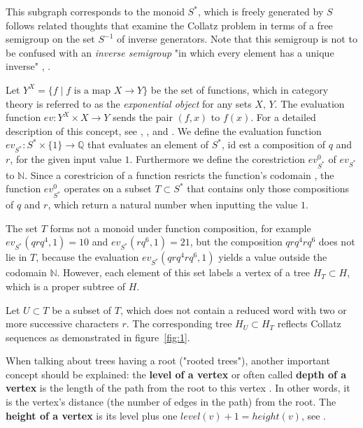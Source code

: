 \par\medskip
This subgraph corresponds to the monoid $S^*$, which is freely generated
by $S$ follows related thoughts \cite{Ref_Truemper_2014} that examine
the Collatz problem in terms of a free semigroup on the set $S^{-1}$ of
inverse generators. Note that this semigroup is not to be confused with an
\textit{inverse semigroup} "in which every element has a unique inverse"
\cite[p.~26]{Ref_Almeida}, \cite[p.~22]{Ref_Loeh}.

\par\medskip
Let $Y^X=\{f\mid f\text{ is a map }X\rightarrow Y\}$ be the set of functions, which in category theory is referred to as the \textit{exponential object} for any sets $X$, $Y$. The evaluation function $ev:Y^X\times X\to Y$ sends the pair $(f,x)$ to $f(x)$. For a detailed description of this concept, see \cite[p.~127]{Ref_Johnsonbaugh}, \cite[p.~155]{Ref_MacLane_Birkhoff}, \cite[p.~54]{Ref_Novak_etal} and \cite[p.~188]{Ref_Pellissier}. We define the evaluation function $ev_{S^*}:S^*\times\{1\}\rightarrow\mathbb{Q}$ that evaluates an element of $S^*$, id est a composition of $q$ and $r$, for the given input value $1$. Furthermore we define the corestriction ${ev^0_{S^*}}$ of $ev_{S^*}$ to $\mathbb{N}$. Since a corestricion of a function resricts the function's codomain \cite[p.~3]{Ref_Helemskii}, the function $ev^0_{S^*}$ operates on a subset $T\subset S^*$ that contains only those compositions of $q$ and $r$, which return a natural number when inputting the value $1$.

\par\medskip
The set $T$ forms not a monoid under function composition, for example $ev_{S^*}(qrq^4,1)=10$ and $ev_{S^*}(rq^6,1)=21$, but the composition $qrq^4rq^6$ does not lie in $T$, because the evaluation $ev_{S^*}(qrq^4rq^6,1)$ yields a value outside the codomain $\mathbb{N}$. However, each element of this set labels a vertex of a tree $H_{T}\subset H$, which is a proper subtree of $H$.

\par\medskip
Let $U\subset T$ be a subset of $T$, which does not contain a reduced word with two or more successive characters $r$. The corresponding tree $H_{U}\subset H_{T}$ reflects Collatz sequences as demonstrated in figure~\ref{fig:1}.

\par\bigskip
\begin{remark}
When talking about trees having a root ("rooted trees"), another important concept should be explained: the \textbf{level of a vertex} or often called \textbf{depth of a vertex} is the length of the path from the root to this vertex \cite[p.~804]{Ref_Rosen}. In other words, it is the vertex's distance (the number of edges in the path) from the root. The \textbf{height of a vertex} is its level plus one $level(v)+1=height(v)$, see \cite[p.~169]{Ref_Makinson}.
\end{remark}

